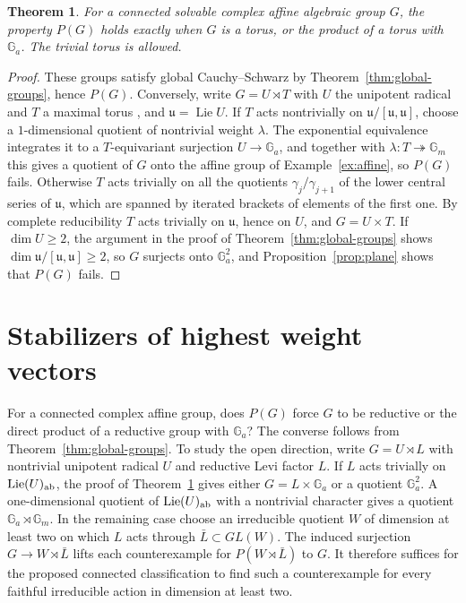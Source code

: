 \documentclass[11pt,reqno]{amsart}
\newtheorem{theorem}{Theorem}[section]
\theoremstyle{definition}
\newcommand{\Ga}{\mathbb G_a}
\newcommand{\Gm}{\mathbb G_m}
\DeclareMathOperator{\Lie}{Lie}
\begin{document}
\begin{theorem}\label{thm:solvable}
For a connected solvable complex affine algebraic group $G$, the property $P(G)$ holds exactly when $G$ is a torus, or the product of a torus with $\Ga$. The trivial torus is allowed.
\end{theorem}

\begin{proof}
These groups satisfy global Cauchy--Schwarz by Theorem~\ref{thm:global-groups}, hence $P(G)$. Conversely, write $G=U\rtimes T$ with $U$ the unipotent radical and $T$ a maximal torus \cite[Theorem~16.33(d)]{Milne}, and $\mathfrak u=\Lie U$. If $T$ acts nontrivially on $\mathfrak u/[\mathfrak u,\mathfrak u]$, choose a $1$-dimensional quotient of nontrivial weight $\lambda$. The exponential equivalence integrates it to a $T$-equivariant surjection $U\to\Ga$, and together with $\lambda\colon T\twoheadrightarrow\Gm$ this gives a quotient of $G$ onto the affine group of Example~\ref{ex:affine}, so $P(G)$ fails. Otherwise $T$ acts trivially on all the quotients $\gamma_j/\gamma_{j+1}$ of the lower central series of $\mathfrak u$, which are spanned by iterated brackets of elements of the first one. By complete reducibility $T$ acts trivially on $\mathfrak u$, hence on $U$, and $G=U\times T$. If $\dim U\geq2$, the argument in the proof of Theorem~\ref{thm:global-groups} shows $\dim\mathfrak u/[\mathfrak u,\mathfrak u]\geq2$, so $G$ surjects onto $\Ga^2$, and Proposition~\ref{prop:plane} shows that $P(G)$ fails.
\end{proof}

\section{Stabilizers of highest weight vectors}\label{sec:stabilizers}
For a connected complex affine group, does $P(G)$ force $G$ to be reductive or the direct product of a reductive group with $\Ga$? The converse follows from Theorem~\ref{thm:global-groups}. To study the open direction, write $G=U\rtimes L$ with nontrivial unipotent radical $U$ and reductive Levi factor $L$. If $L$ acts trivially on $\Lie(U)_{\rm ab}$, the proof of Theorem~\ref{thm:solvable} gives either $G=L\times\Ga$ or a quotient $\Ga^2$. A one-dimensional quotient of $\Lie(U)_{\rm ab}$ with a nontrivial character gives a quotient $\Ga\rtimes\Gm$. In the remaining case choose an irreducible quotient $W$ of dimension at least two on which $L$ acts through $\bar L\subset GL(W)$. The induced surjection $G\to W\rtimes\bar L$ lifts each counterexample for $P(W\rtimes\bar L)$ to $G$. It therefore suffices for the proposed connected classification to find such a counterexample for every faithful irreducible action in dimension at least two.
\end{document}
